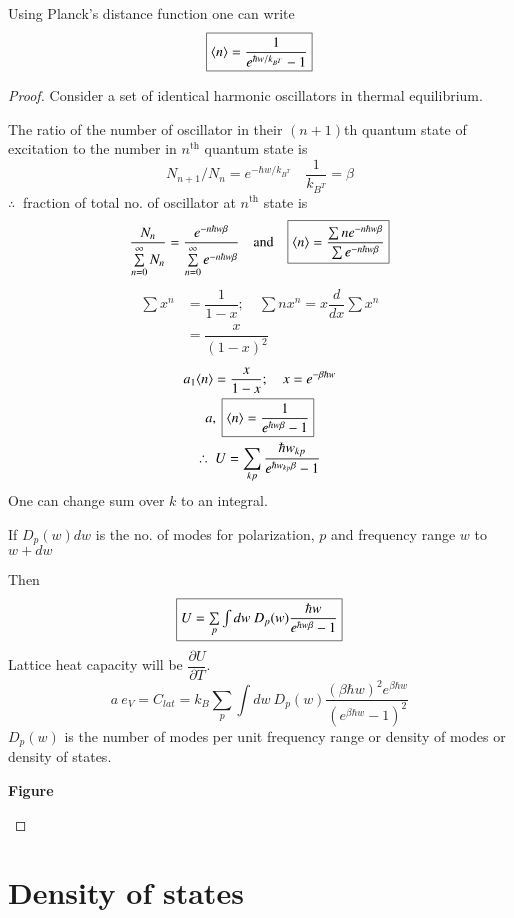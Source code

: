 Using Planck's distance function one can write
$$
\fbox{$\langle n\rangle = \dfrac{1}{e^{\hbar w/k_{B^{T}}}-1}$}
$$

\begin{proof}
Consider a set of identical harmonic oscillators in thermal equilibrium.

The ratio of the number of oscillator in their $(n+1)$th quantum state of excitation to the number in $n^{\text{th}}$ quantum state is
$$
N_{n+1}/N_{n}=e^{-\hbar w/k_{B^{T}}}\quad \dfrac{1}{k_{B^{T}}}=\beta
$$
$\therefore \ $ fraction of total no. of oscillator at $n^{\text{th}}$ state is
$$
\dfrac{N_{n}}{\sum\limits^{\infty}_{n=0}N_{n}}=\dfrac{e^{-n\hbar w\beta}}{\sum\limits^{\infty}_{n=0}e^{-n\hbar w\beta}}\quad\text{and}\quad 
\fbox{$\langle n\rangle = \dfrac{\sum ne^{-n\hbar w\beta}}{\sum e^{-n\hbar w\beta}}$}
$$
\begin{align*}
\sum x^{n}&=\dfrac{1}{1-x};\quad \sum nx^{n}=x\dfrac{d}{dx}\sum x^{n}\\
&= \dfrac{x}{(1-x)^{2}}
\end{align*}
\begin{gather*}
a_{1}\langle n\rangle =\dfrac{x}{1-x};\quad x=e^{-\beta \hbar w}\\
a, \ \fbox{$\langle n\rangle = \dfrac{1}{e^{\hbar w\beta}-1}$}\\
\therefore \ U = \sum\limits_{kp}\dfrac{\hbar w_{kp}}{e^{\hbar w_{kp}\beta}-1}
\end{gather*}
One can change sum over $k$ to an integral.

If $D_{p}(w)dw$ is the no. of modes for polarization, $p$ and frequency range $w$ to $w+dw$

Then
$$
\fbox{$U=\sum\limits_{p}\int dw \ D_{p}(w)\dfrac{\hbar w}{e^{\hbar w\beta}-1}$}
$$
Lattice heat capacity will be $\dfrac{\partial U}{\partial T}$.
$$
a \ e_{V}=C_{lat}=k_{B}\sum\limits_{p}\int dw \ D_{p}(w)\dfrac{(\beta \hbar w)^{2}e^{\beta\hbar w}}{\left(e^{\beta \hbar w}-1\right)^{2}}
$$
$D_{p}(w)$ is the number of modes per unit frequency range or density of modes or density of states.
\begin{center}
{\bf Figure}
\end{center}
\end{proof}

\section*{Density of states}

